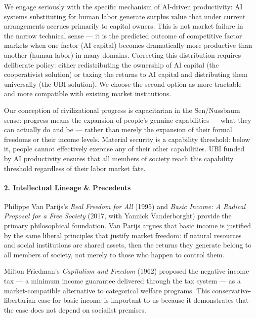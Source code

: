 We engage seriously with the specific mechanism of AI-driven
productivity: AI systems substituting for human labor generate surplus
value that under current arrangements accrues primarily to capital
owners. This is not market failure in the narrow technical sense --- it
is the predicted outcome of competitive factor markets when one factor
(AI capital) becomes dramatically more productive than another (human
labor) in many domains. Correcting this distribution requires deliberate
policy: either redistributing the ownership of AI capital (the
cooperativist solution) or taxing the returns to AI capital and
distributing them universally (the UBI solution). We choose the second
option as more tractable and more compatible with existing market
institutions.

Our conception of civilizational progress is capacitarian in the
Sen/Nussbaum sense: progress means the expansion of people's genuine
capabilities --- what they can actually do and be --- rather than merely
the expansion of their formal freedoms or their income levels. Material
security is a capability threshold: below it, people cannot effectively
exercise any of their other capabilities. UBI funded by AI productivity
ensures that all members of society reach this capability threshold
regardless of their labor market fate.

\paragraph{2. Intellectual Lineage \&
Precedents}\label{intellectual-lineage-precedents-43}

Philippe Van Parijs's \emph{Real Freedom for All} (1995) and \emph{Basic
Income: A Radical Proposal for a Free Society} (2017, with Yannick
Vanderborght) provide the primary philosophical foundation. Van Parijs
argues that basic income is justified by the same liberal principles
that justify market freedom: if natural resources and social
institutions are shared assets, then the returns they generate belong to
all members of society, not merely to those who happen to control them.

Milton Friedman's \emph{Capitalism and Freedom} (1962) proposed the
negative income tax --- a minimum income guarantee delivered through the
tax system --- as a market-compatible alternative to categorical welfare
programs. This conservative-libertarian case for basic income is
important to us because it demonstrates that the case does not depend on
socialist premises.

